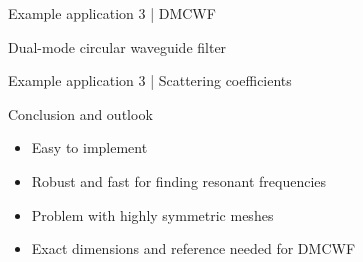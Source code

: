 \documentclass{beamer}
\begin{document}
\begin{frame}{Example application 3 | DMCWF}

    Dual-mode circular waveguide filter

    \begin{figure}
        \centering
    \end{figure}

\end{frame}

\begin{frame}{Example application 3 | Scattering coefficients}

    \begin{figure}
        \centering
        \scalebox{0.7}{}
    \end{figure}

\end{frame}

\begin{frame}{Conclusion and outlook}

    \begin{itemize}
        \item<1-> Easy to implement
        \item<2-> Robust and fast for finding resonant frequencies
        \item<3-> Problem with highly symmetric meshes
        \item<4-> Exact dimensions and reference needed for DMCWF
    \end{itemize}

\end{frame}
\end{document}
